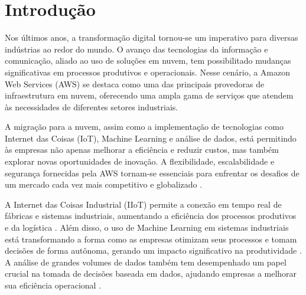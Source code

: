 \documentclass[
	12pt,				%
	openright,			%
	twoside,			%
	a4paper,			%
	english,			%
	french,				%
	spanish,			%
	brazil,				%
	]{abntex2}
\begin{document}

\frenchspacing


\imprimircapa




\tableofcontents*
\cleardoublepage


\textual

\chapter*[Introdução]{Introdução}

Nos últimos anos, a transformação digital tornou-se um imperativo para diversas indústrias ao redor do mundo. O avanço das tecnologias da informação e comunicação, aliado ao uso de soluções em nuvem, tem possibilitado mudanças significativas em processos produtivos e operacionais. Nesse cenário, a Amazon Web Services (AWS) se destaca como uma das principais provedoras de infraestrutura em nuvem, oferecendo uma ampla gama de serviços que atendem às necessidades de diferentes setores industriais.

A migração para a nuvem, assim como a implementação de tecnologias como Internet das Coisas (IoT), Machine Learning e análise de dados, está permitindo às empresas não apenas melhorar a eficiência e reduzir custos, mas também explorar novas oportunidades de inovação. A flexibilidade, escalabilidade e segurança fornecidas pela AWS tornam-se essenciais para enfrentar os desafios de um mercado cada vez mais competitivo e globalizado \cite{armbrust2010}.

A Internet das Coisas Industrial (IIoT) permite a conexão em tempo real de fábricas e sistemas industriais, aumentando a eficiência dos processos produtivos e da logística \cite{gilchrist2016}. Além disso, o uso de Machine Learning em sistemas industriais está transformando a forma como as empresas otimizam seus processos e tomam decisões de forma autônoma, gerando um impacto significativo na produtividade \cite{zhong2017}. A análise de grandes volumes de dados também tem desempenhado um papel crucial na tomada de decisões baseada em dados, ajudando empresas a melhorar sua eficiência operacional \cite{manyika2011}.
\end{document}
